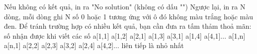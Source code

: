 Nếu không có kết quả, in ra "No solution" (không có dấu "") Ngược lại, in ra N dòng, mỗi dòng ghi N số 0 hoặc 1 tương ứng với ô đó không màu trắng hoặc màu đen. Để tránh trường hợp có nhiều kết quả, bạn cần đưa ra tấm thảm thoả mãn: số nhận được khi viết các số a[1,1] a[1,2] a[2,1] a[1,3] a[3,1] a[1,4] a[4,1]... a[1,n] a[n,1] a[2,2] a[2,3] a[3,2] a[2,4] a[4,2]... liên tiếp là nhỏ nhất  

\